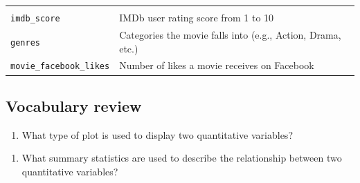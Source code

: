 \documentclass[
]{report}
\providecommand{\tightlist}{%
  \setlength{\itemsep}{0pt}\setlength{\parskip}{0pt}}
\begin{document}
\begin{longtable}[]{@{}ll@{}}
\begin{minipage}[t]{0.72\columnwidth}
\end{minipage}\tabularnewline
\begin{minipage}[t]{0.22\columnwidth}\raggedright
\texttt{imdb\_score}\strut
\end{minipage} & \begin{minipage}[t]{0.72\columnwidth}\raggedright
IMDb user rating score from 1 to 10\strut
\end{minipage}\tabularnewline
\begin{minipage}[t]{0.22\columnwidth}\raggedright
\texttt{genres}\strut
\end{minipage} & \begin{minipage}[t]{0.72\columnwidth}\raggedright
Categories the movie falls into (e.g., Action, Drama, etc.)\strut
\end{minipage}\tabularnewline
\begin{minipage}[t]{0.22\columnwidth}\raggedright
\texttt{movie\_facebook\_likes}\strut
\end{minipage} & \begin{minipage}[t]{0.72\columnwidth}\raggedright
Number of likes a movie receives on Facebook\strut
\end{minipage}\tabularnewline
\bottomrule
\end{longtable}

\newpage

\hypertarget{vocabulary-review}{%
\subsection*{Vocabulary review}\label{vocabulary-review}}

\begin{enumerate}
\def\labelenumi{\arabic{enumi}.}
\tightlist
\item
  What type of plot is used to display two quantitative variables?
\end{enumerate}

\vspace{0.2in}

\begin{enumerate}
\def\labelenumi{\arabic{enumi}.}
\setcounter{enumi}{1}
\tightlist
\item
  What summary statistics are used to describe the relationship between two quantitative variables?
\end{enumerate}

\vspace{0.3in}
\end{document}
